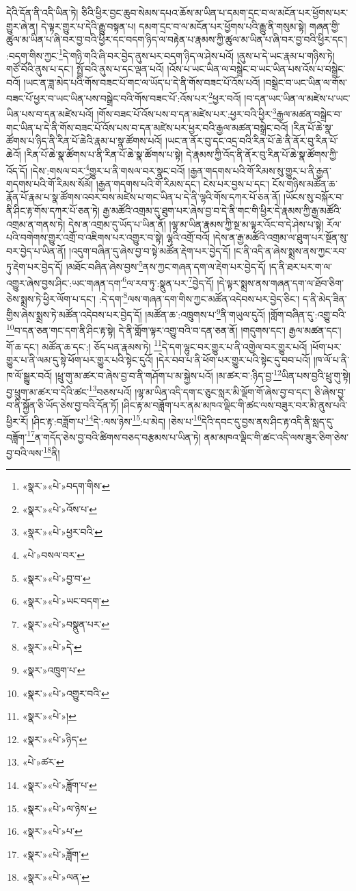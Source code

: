 དེའི་དོན་ནི་འདི་ཡིན་ཏེ། ཅིའི་ཕྱིར་བྱང་ཆུབ་སེམས་དཔའ་ཆོས་མ་ཡིན་པ་དམག་དྲང་བ་ལ་མངོན་པར་ཕྱོགས་པར་གྱུར་ཞེ་ན། དེ་ལྟར་གྱུར་པ་དེའི་རྒྱུ་བསྟན་པ། དམག་དྲང་བ་ལ་མངོན་པར་ཕྱོགས་པའི་རྒྱུ་ནི་གསུམ་སྟེ། གཞན་གྱི་ཚུལ་མ་ཡིན་པ་ཞི་བར་བྱ་བའི་ཕྱིར་དང་བདག་ཉིད་ལ་བརྟེན་པ་རྣམས་ཀྱི་ཚུལ་མ་ཡིན་པ་ཞི་བར་བྱ་བའི་ཕྱིར་དང་། :བདག་གིས་ཀྱང་\footnote{«སྣར་»«པེ་»བདག་གིས་}དེ་གཉི་གའི་ཞི་བར་བྱེད་ནུས་པར་བདག་ཉིད་ལ་ཤེས་པའོ། །ནུས་པ་དེ་ཡང་རྣམ་པ་གཉིས་ཏེ། གཙོ་བོའི་ནུས་པ་དང་། སྤྲོ་བའི་ནུས་པ་དང་ལྡན་པའོ། །འོས་པ་ཡང་ཡིན་ལ་བསྒྲེང་བ་ཡང་ཡིན་པས་འོས་པ་བསྒྲེང་བའོ། །ཡང་ན་ཟླ་མེད་པའི་གོས་བཟང་པོ་གང་ལ་ཡོད་པ་དེ་ནི་གོས་བཟང་པོ་འོས་པའོ། །བསྒྲེང་བ་ཡང་ཡིན་ལ་གོས་བཟང་པོ་ཕྱར་བ་ཡང་ཡིན་པས་བསྒྲེང་བའི་གོས་བཟང་པོ་:འོས་པར་\footnote{«སྣར་»«པེ་»འོས་པ་}ཕྱར་བའོ། །བ་དན་ཡང་ཡིན་ལ་མཛེས་པ་ཡང་ཡིན་པས་བ་དན་མཛེས་པའོ། །གོས་བཟང་པོ་འོས་པས་བ་དན་མཛེས་པར་:ཕྱར་བའི་ཕྱིར་\footnote{«སྣར་»«པེ་»ཕྱར་བའི་}རྒྱལ་མཚན་བསྒྲེང་བ་གང་ཡིན་པ་དེ་ནི་གོས་བཟང་པོ་འོས་པས་བ་དན་མཛེས་པར་ཕྱར་བའི་རྒྱལ་མཚན་བསྒྲེང་བའོ། །རིན་པོ་ཆེ་སྣ་ཚོགས་པ་ཉིད་ནི་རིན་པོ་ཆེའི་རྣམ་པ་སྣ་ཚོགས་པའོ། །ཡང་ན་ནོར་བུ་དང་འདྲ་བའི་རིན་པོ་ཆེ་ནི་ནོར་བུ་རིན་པོ་ཆེའོ། །རིན་པོ་ཆེ་སྣ་ཚོགས་པ་ནི་རིན་པོ་ཆེ་སྣ་ཚོགས་པ་སྟེ། དེ་རྣམས་ཀྱི་འོད་ནི་ནོར་བུ་རིན་པོ་ཆེ་སྣ་ཚོགས་ཀྱི་འོད་དོ། །དེས་:གསལ་བར་\footnote{«པེ་»བསལ་བར་}གྱུར་པ་ནི་གསལ་བར་སྣང་བའོ། །རྒྱན་གདགས་པའི་གོ་རིམས་སུ་གྱུར་པ་ནི་རྒྱན་གདགས་པའི་གོ་རིམས་སོམོ། །རྒྱན་གདགས་པའི་གོ་རིམས་དང་། ངེས་པར་བྱས་པ་དང་། ངོས་གཉིས་མཚོན་ཆ་རྣོན་པོ་རྣམ་པ་སྣ་ཚོགས་འབར་བས་མཛེས་པ་གང་ཡིན་པ་དེ་ནི་ལྷའི་གོས་དཀར་པོ་ཅན་ནོ། །ཡོངས་སུ་བསྐོར་བ་ནི་ཤིང་རྟ་གོས་དཀར་པོ་ཅན་ཏེ། རྒྱ་མཚོའི་འགྲམ་དུ་ཐུག་པར་ཞེས་བྱ་བ་དེ་ནི་གང་གི་ཕྱིར་དེ་རྣམས་ཀྱི་རྒྱ་མཚོའི་འགྲམ་ན་གནས་ཏེ། དེས་ན་འགྲམ་དུ་ཡོད་པ་ཡིན་ནོ། །ལྷ་མ་ཡིན་རྣམས་ཀྱི་སྔ་མ་ལྟར་འོང་བ་དེ་ཤེས་པ་སྟེ། རོལ་པའི་བགེགས་གྱུར་འགྲོ་བ་འཇིགས་པར་འགྱུར་བ་སྟེ། ལྷའི་འགྲོ་བའོ། །དེས་ན་རྒྱ་མཚོའི་འགྲམ་ལ་ཐུག་པར་སྔོན་སུ་བར་བྱེད་པ་ཡིན་ནོ། །འདུག་བཞིན་དུ་ཞེས་བྱ་བ་སྟེ་མཚོན་རྡེག་པར་བྱེད་དོ། །ང་ནི་འདི་ན་ཞེས་སྨྲས་ནས་ཀྱང་རབ་ཏུ་རྡེག་པར་བྱེད་དོ། །མཐོང་བཞིན་ཞེས་བྱས་\footnote{«སྣར་»«པེ་»བྱ་བ་}ནས་ཀྱང་གཞན་དག་ལ་རྡེག་པར་བྱེད་དོ། །ད་ནི་ཐར་པར་ག་ལ་འགྱུར་ཞེས་བྱས་ཤིང་:ཡང་གཞན་དག་\footnote{«སྣར་»«པེ་»ཡང་བདག་}ལ་རབ་ཏུ་:སྣུན་པར་\footnote{«སྣར་»«པེ་»བསྣུན་པར་}བྱེད་དོ། །དེ་ལྟར་སྨྲས་ནས་གཞན་དག་ལ་ཐོབ་ཅིག་ཅེས་སྨྲས་ཏེ་ཕྱིར་ལོག་པ་དང་། :དེ་དག་\footnote{«སྣར་»«པེ་»དེ་}ལས་གཞན་དག་གིས་ཀྱང་མཚོན་འདེབས་པར་བྱེད་ཅིང་། ད་ནི་མེད་ཟིན་གྱིས་ཞེས་སྨྲས་ཏེ་མཚོན་འདེབས་པར་བྱེད་དོ། །མཚོན་ཆ་:འཁྲུགས་པ་\footnote{«སྣར་»འཁྲུག་པ་}ནི་གཡུལ་དུའོ། །གློག་བཞིན་དུ་:འགྱུ་བའི་\footnote{«སྣར་»«པེ་»འགྱུར་བའི་}བ་དན་ཅན་གང་དག་ནི་ཤིང་རྟ་སྟེ། དེ་ནི་གློག་ལྟར་འགྱུ་བའི་བ་དན་ཅན་ནོ། །གདུགས་དང་། རྒྱལ་མཚན་དང་། གོ་ཆ་དང་། མཚོན་ཆ་དང་:། ཅོད་པན་རྣམས་ཏེ། \footnote{«སྣར་»«པེ་»།  }དེ་དག་ལྷུང་བར་གྱུར་པ་ནི་འགྱེལ་བར་གྱུར་པའོ། །ཕོག་པར་གྱུར་པ་ནི་ལམ་དུ་སྟེ་ཕོག་པར་གྱུར་པའི་སྟེང་དུའོ། །དེར་བབ་པ་ནི་ཕོག་པར་གྱུར་པའི་སྟེང་དུ་བབ་པའོ། །ཁ་ལོ་པ་ནི་ཁ་ལོ་སྒྱུར་བའོ། །ཕྲུ་གུ་མ་ཚར་བ་ཞེས་བྱ་བ་ནི་གཤོག་པ་མ་སྐྱེས་པའོ། །མ་ཚར་བ་:ཉིད་བྱ་\footnote{«སྣར་»«པེ་»ཉིད་}ཡིན་པས་བྱའི་ཕྲུ་གུ་སྟེ། བྱ་ཕྲུག་མ་ཚར་བ་དེའི་ཚང་\footnote{«པེ་»ཚར་}བཅས་པའོ། །ལྷ་མ་ཡིན་འདི་དག་ང་ཅུང་སླར་མི་ལྡོག་གོ་ཞེས་བྱ་བ་དང་། ཅི་ཞེས་བྱ་བ་ནི་སྐྱོན་ཅི་ཡོད་ཅེས་བྱ་བའི་དོན་ཏོ། །ཤིང་རྟ་མ་བཟློག་པར་ནམ་མཁའ་ལྡིང་གི་ཚང་ལས་བཟུར་བར་མི་ནུས་པའི་ཕྱིར་རོ། །ཤིང་རྟ་:བཟློག་པ་\footnote{«སྣར་»«པེ་»ཟློག་པ་}དེ་:ལས་ཉེས་\footnote{«སྣར་»«པེ་»ལ་ཉེས་}:པ་མེད། །ཅེས་པ་\footnote{«སྣར་»«པེ་»པ་}དེའི་དབང་དུ་བྱས་ནས་ཤིང་རྟ་འདི་ནི་སླད་དུ་བཟློག་\footnote{«སྣར་»«པེ་»ཟློག་}ན་གདོད་ཅེས་བྱ་བའི་ཚིགས་བཅད་བརྩམས་པ་ཡིན་ཏེ། ནམ་མཁའ་ལྡིང་གི་ཚང་འདི་ལས་ཟུར་ཅིག་ཅེས་བྱ་བའི་ལས་\footnote{«སྣར་»«པེ་»ལན་}ནི། 